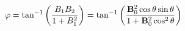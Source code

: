 \begin{equation}\label{varp}
\varphi=\tan^{-1}\left(\frac{B_1B_2}{1+B_1^2}\right)
=\tan^{-1}\left(
    \frac{{\bf B}_0^2\cos\theta\sin\theta}{1+{\bf B}_0^2\cos^2\theta}\right)
\end{equation}

